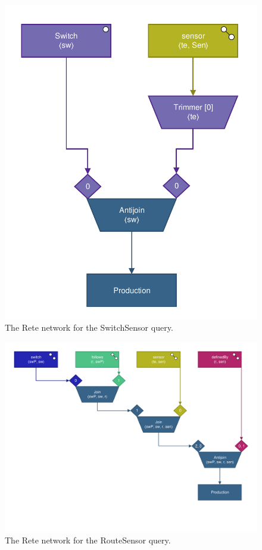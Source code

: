 \begin{figure}[htb]
\begin{minipage}[b]{0.4\textwidth}
\begin{center}
\includegraphics[scale=0.5]{figures/rete-switchsensor-layout.pdf}
\caption{The Rete network for the \textsf{SwitchSensor} query.}
\label{fig:rete-switchsensor-layout}
\end{center}
\end{minipage}
\end{figure}

\begin{figure}[htb]
\begin{center}
\includegraphics[scale=0.5]{figures/rete-routesensor-layout.pdf}
\caption{The Rete network for the \textsf{RouteSensor} query.}
\label{fig:rete-routesensor-layout}
\end{center}
\end{figure}

